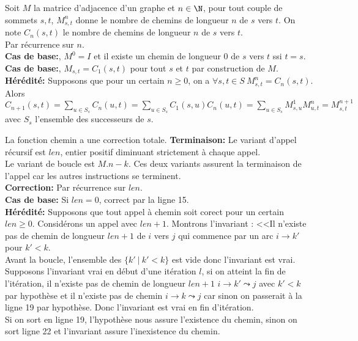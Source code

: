 \documentclass[french, 11pt]{article}
\begin{document}
\begin{prop}{}{}
    Soit $M$ la matrice d'adjacence d'un graphe et $n\in\N$, pour tout couple de sommets $s,t$, $M_{s,t}^n$ donne le nombre de chemins de longueur $n$ de $s$ vers $t$.
    \tcblower
    On note $C_n(s,t)$ le nombre de chemins de longueur $n$ de $s$ vers $t$.\\
    Par récurrence sur $n$.\\
    \textbf{Cas de base:}, $M^0=I$ et il existe un chemin de longueur 0 de $s$ vers $t$ ssi $t=s$.\\
    \textbf{Cas de base:}, $M_{s,t}=C_1(s,t)$ pour tout $s$ et $t$ par construction de $M$.\\
    \textbf{Hérédité:} Supposons que pour un certain $n\geq0$, on a $\forall s,t\in S ~ M_{s,t}^n=C_n(s,t)$.\\
    Alors $C_{n+1}(s,t)=\sum_{u\in S_s}C_n(u,t)=\sum_{u\in S_s}C_1(s,u)C_n(u,t)=\sum_{u\in S_s}M^1_{s,u}M^n_{u,t}=M^{n+1}_{s,t}$ avec $S_s$ l'ensemble des successeurs de $s$. 
\end{prop}

\begin{prop}{}{}
    La fonction chemin a une correction totale.
    \tcblower
    \textbf{Terminaison:} Le variant d'appel récursif est $len$, entier positif diminuant strictement à chaque appel.\\
    Le variant de boucle est $M.n-k$. Ces deux variants assurent la terminaison de l'appel car les autres instructions se terminent.\\
    \textbf{Correction:} Par récurrence sur $len$.\\
    \textbf{Cas de base:} Si $len=0$, correct par la ligne 15.\\
    \textbf{Hérédité:} Supposons que tout appel à chemin soit corect pour un certain $len\geq0$. Considérons un appel avec $len+1$. Montrons l'invariant : <<Il n'existe pas de chemin de longueur $len+1$ de $i$ vers $j$ qui commence par un arc $i\to k'$ pour $k'<k$.\\
    Avant la boucle, l'ensemble des $\{k'~|~k'<k\}$ est vide donc l'invariant est vrai.\\
    Supposons l'invariant vrai en début d'une itération $l$, si on atteint la fin de l'itération, il n'existe pas de chemin de longueur $len+1$ $i\to k'\leadsto j$ avec $k'<k$ par hypothèse et il n'existe pas de chemin $i\to k \leadsto j$ car sinon on passerait à la ligne 19 par hypothèse. Donc l'invariant est vrai en fin d'itération.\\
    Si on sort en ligne 19, l'hypothèse nous assure l'existence du chemin, sinon on sort ligne 22 et l'invariant assure l'inexistence du chemin.
\end{prop}
\end{document}

